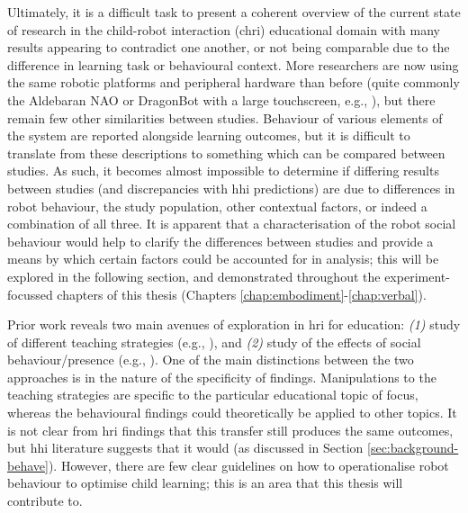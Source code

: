 Ultimately, it is a difficult task to present a coherent overview of the current state of research in the child-robot interaction (\acrshort{chri}) educational domain with many results appearing to contradict one another, or not being comparable due to the difference in learning task or behavioural context. More researchers are now using the same robotic platforms and peripheral hardware than before (quite commonly the Aldebaran NAO or DragonBot with a large touchscreen, e.g., \citealp{baxter2012touchscreen}), but there remain few other similarities between studies. Behaviour of various elements of the system are reported alongside learning outcomes, but it is difficult to translate from these descriptions to something which can be compared between studies. As such, it becomes almost impossible to determine if differing results between studies (and discrepancies with \acrshort{hhi} predictions) are due to differences in robot behaviour, the study population, other contextual factors, or indeed a combination of all three. It is apparent that a characterisation of the robot social behaviour would help to clarify the differences between studies and provide a means by which certain factors could be accounted for in analysis; this will be explored in the following section, and demonstrated throughout the experiment-focussed chapters of this thesis (Chapters \ref{chap:embodiment}-\ref{chap:verbal}).

Prior work reveals two main avenues of exploration in \acrshort{hri} for education: \textit{(1)} study of different teaching strategies (e.g., \citealp{leyzberg2014personalizing,ramachandran2016shaping}), and \textit{(2)} study of the effects of social behaviour/presence (e.g., \citealp{kanda2004interactive,saerbeck2010expressive,zaga2015effect}). One of the main distinctions between the two approaches is in the nature of the specificity of findings. Manipulations to the teaching strategies are specific to the particular educational topic of focus, whereas the behavioural findings could theoretically be applied to other topics. It is not clear from \acrshort{hri} findings that this transfer still produces the same outcomes, but \acrshort{hhi} literature suggests that it would (as discussed in Section \ref{sec:background-behave}). However, there are few clear guidelines on how to operationalise robot behaviour to optimise child learning; this is an area that this thesis will contribute to.

